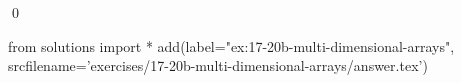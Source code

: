 
\begin{ex} 
  \label{ex:17-20b-multi-dimensional-arrays}
  
  \qed
\end{ex} 
\begin{python0}
from solutions import *
add(label="ex:17-20b-multi-dimensional-arrays",
    srcfilename='exercises/17-20b-multi-dimensional-arrays/answer.tex') 
\end{python0}
